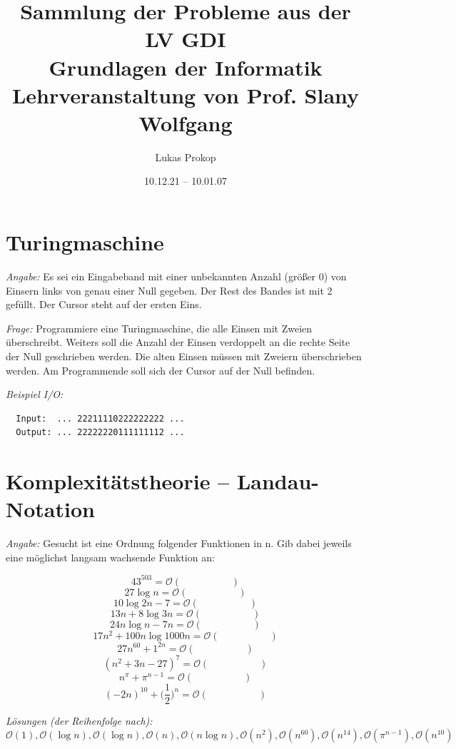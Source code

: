 \documentclass[11pt,a4paper]{article}
\author{Lukas Prokop}
\title{Sammlung der Probleme aus der LV GDI \\
    \small{Grundlagen der Informatik} \\
    \small{Lehrveranstaltung von Prof. Slany Wolfgang}
}
\date{10.12.21 -- 10.01.07}
\theoremstyle{area}
\begin{document}
\maketitle

\section{Turingmaschine}

\emph{Angabe:} Es sei ein Eingabeband mit einer unbekannten Anzahl (größer
0) von Einsern links von genau einer Null gegeben. Der Rest des Bandes ist
mit 2 gefüllt. Der Cursor steht auf der ersten Eins.

\emph{Frage:} Programmiere eine Turingmaschine, die alle Einsen mit
Zweien überschreibt. Weiters soll die Anzahl der Einsen verdoppelt an
die rechte Seite der Null geschrieben werden. Die alten Einsen müssen
mit Zweiern überschrieben werden. Am Programmende soll sich der Cursor
auf der Null befinden.

\emph{Beispiel I/O:}
\begin{verbatim}
  Input:  ... 22211110222222222 ...
  Output: ... 22222220111111112 ...
\end{verbatim}

\section{Komplexitätstheorie -- Landau-Notation}

\emph{Angabe:} Gesucht ist eine Ordnung folgender Funktionen in n.
    Gib dabei jeweils eine möglichst langsam wachsende Funktion an:

\newcommand{\OL}{\mathcal{O}}
\newcommand{\landau}{\OL ( \hspace{60pt} )}
\[
    43^{503} = \landau
\] \[
    27 \log{n} = \landau
\] \[
    10 \log{2n} - 7 = \landau
\] \[
    13n + 8\log{3n} = \landau
\] \[
    24n \log{n} - 7n = \landau
\] \[
    17n^2 + 100n\log{1000n} = \landau
\] \[
    27n^{60} + 1^{2n} = \landau
\] \[
    (n^2 + 3n - 27)^7 = \landau
\] \[
    n^\pi  + \pi^{n-1} = \landau
\] \[
    (-2n)^{10} + \Big(\frac{1}{2}\Big)^n = \landau
\]

\emph{Lösungen (der Reihenfolge nach):}
\[
    \OL(1), \OL(\log{n}), \OL(\log{n}), \OL(n), \OL(n\log{n}),
    \OL(n^2), \OL(n^{60}), \OL(n^{14}), \OL(\pi^{n-1}), \OL(n^{10})
\] %
\end{document}
